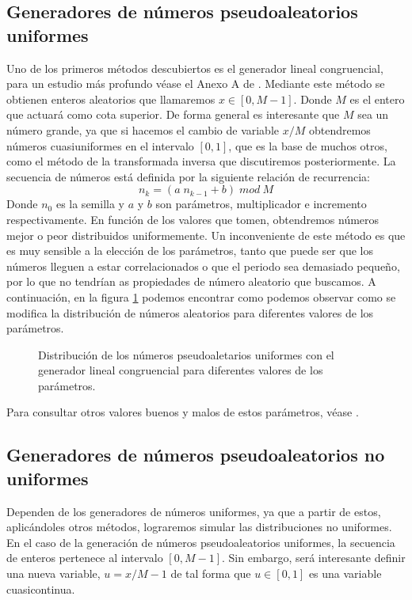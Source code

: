 \subsection{Generadores de números pseudoaleatorios uniformes}
Uno de los primeros métodos descubiertos es el generador lineal congruencial, para un estudio más profundo véase el Anexo A de \cite{Toral}. Mediante 
este método se obtienen enteros aleatorios que llamaremos $x\in [0,M-1]$. Donde $M$ es el entero que actuará como cota superior. De forma general
es interesante que $M$ sea un número grande, ya que si hacemos el cambio de variable $x/M$ obtendremos números cuasiuniformes en el intervalo $[0,1]$,
que es la base de muchos otros, como el método de la transformada inversa que discutiremos posteriormente.
La secuencia de números está definida por la siguiente relación de recurrencia:
\begin{equation}
    n_k=(a\; n_{k-1}+b)\; mod\: M
\end{equation}
Donde $n_0$ es la semilla y $a$ y $b$ son parámetros, multiplicador e incremento respectivamente. En función de los valores que tomen, obtendremos números
mejor o peor distribuidos uniformemente. Un inconveniente de este método es que es muy sensible a la elección de los parámetros, tanto que puede ser que los
números lleguen a estar correlacionados o que el periodo sea demasiado pequeño, por lo que no tendrían as propiedades de número aleatorio que buscamos.
A continuación, en la figura \ref{f:LGC} podemos encontrar como podemos observar como se modifica la distribución de números aleatorios para diferentes
valores de los parámetros.


\begin{figure}[H]
    \centering
    \caption{Distribución de los números pseudoaletarios uniformes con el generador lineal congruencial para diferentes valores de los parámetros.}
    \label{f:LGC}
\end{figure}

Para consultar otros valores buenos y malos de estos parámetros, véase \cite{park1988random}.
\newpage
\subsection{Generadores de números pseudoaleatorios no uniformes}
Dependen de los generadores de números uniformes, ya que a partir de estos, aplicándoles otros métodos, lograremos simular las distribuciones
no uniformes. En el caso de la generación de números pseudoaleatorios uniformes, la secuencia de enteros pertenece al intervalo $[0,M-1]$. Sin embargo, será
interesante definir una nueva variable, $u=x/M-1$ de tal forma que $u\in [0,1]$ es una variable cuasicontinua.

